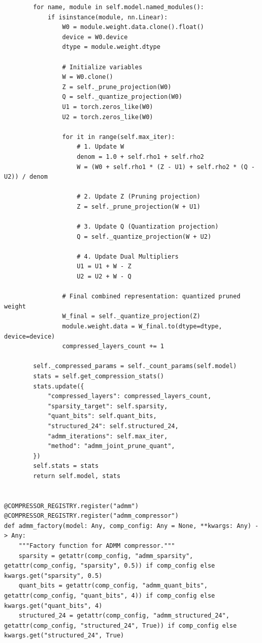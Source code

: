 \begin{lstlisting}
        for name, module in self.model.named_modules():
            if isinstance(module, nn.Linear):
                W0 = module.weight.data.clone().float()
                device = W0.device
                dtype = module.weight.dtype

                # Initialize variables
                W = W0.clone()
                Z = self._prune_projection(W0)
                Q = self._quantize_projection(W0)
                U1 = torch.zeros_like(W0)
                U2 = torch.zeros_like(W0)

                for it in range(self.max_iter):
                    # 1. Update W
                    denom = 1.0 + self.rho1 + self.rho2
                    W = (W0 + self.rho1 * (Z - U1) + self.rho2 * (Q - U2)) / denom

                    # 2. Update Z (Pruning projection)
                    Z = self._prune_projection(W + U1)

                    # 3. Update Q (Quantization projection)
                    Q = self._quantize_projection(W + U2)

                    # 4. Update Dual Multipliers
                    U1 = U1 + W - Z
                    U2 = U2 + W - Q

                # Final combined representation: quantized pruned weight
                W_final = self._quantize_projection(Z)
                module.weight.data = W_final.to(dtype=dtype, device=device)
                compressed_layers_count += 1

        self._compressed_params = self._count_params(self.model)
        stats = self.get_compression_stats()
        stats.update({
            "compressed_layers": compressed_layers_count,
            "sparsity_target": self.sparsity,
            "quant_bits": self.quant_bits,
            "structured_24": self.structured_24,
            "admm_iterations": self.max_iter,
            "method": "admm_joint_prune_quant",
        })
        self.stats = stats
        return self.model, stats


@COMPRESSOR_REGISTRY.register("admm")
@COMPRESSOR_REGISTRY.register("admm_compressor")
def admm_factory(model: Any, comp_config: Any = None, **kwargs: Any) -> Any:
    """Factory function for ADMM compressor."""
    sparsity = getattr(comp_config, "admm_sparsity", getattr(comp_config, "sparsity", 0.5)) if comp_config else kwargs.get("sparsity", 0.5)
    quant_bits = getattr(comp_config, "admm_quant_bits", getattr(comp_config, "quant_bits", 4)) if comp_config else kwargs.get("quant_bits", 4)
    structured_24 = getattr(comp_config, "admm_structured_24", getattr(comp_config, "structured_24", True)) if comp_config else kwargs.get("structured_24", True)


\end{lstlisting}
